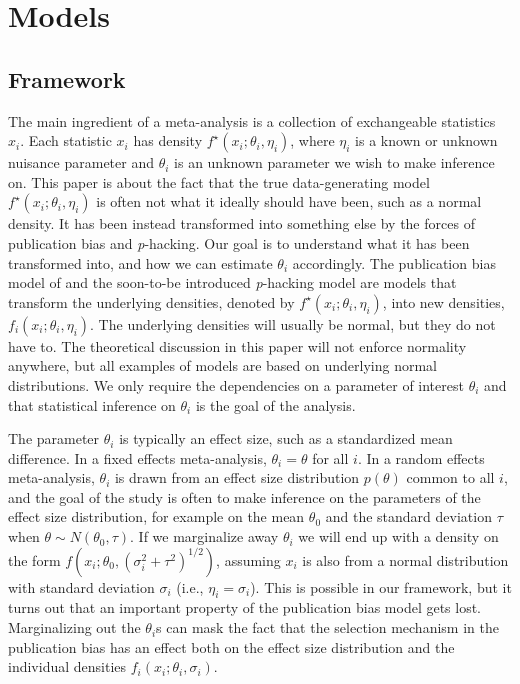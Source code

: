 \documentclass{article}
\theoremstyle{plain}
\theoremstyle{definition}
\renewcommand{\sqrt}[1]{(#1)^{1/2}}
\begin{document}
\section{Models}\label{sect:models}

\subsection{Framework}
The main ingredient of a meta-analysis is a collection of exchangeable statistics $x_{i}$. Each statistic $x_{i}$ has density $f^{\star}\left(x_{i};\theta_{i},\eta_{i}\right)$, where $\eta_i$ is a known or unknown nuisance parameter and $\theta_{i}$ is an unknown parameter we wish to make inference on. This paper is about the fact that the true data-generating model $f^{\star}\left(x_{i};\theta_{i},\eta_{i}\right)$ is often not what it ideally should have been, such as a normal density. It has been instead transformed into something else by the forces of publication bias and \textit{p}-hacking. Our goal is to understand what it has been transformed into, and how we can estimate $\theta_{i}$ accordingly. The publication bias model of \citet{hedges1992modeling,iyengar1988selection} and the soon-to-be introduced \textit{p}-hacking model are models that transform the underlying densities, denoted by $f^{\star}\left(x_{i};\theta_{i},\eta_{i}\right)$, into new densities, $f_{i}\left(x_{i};\theta_{i},\eta_{i}\right)$. The underlying densities will usually be normal, but they do not have to. The theoretical discussion in this paper will not enforce normality anywhere, but all examples of models are based on underlying normal distributions. We only require the dependencies on a parameter of interest $\theta_{i}$ and that statistical inference on $\theta_{i}$ is the goal of the analysis.

The parameter $\theta_{i}$ is typically an effect size, such as a standardized mean difference. In a fixed effects meta-analysis, $\theta_{i}=\theta$ for all $i$. In a random effects meta-analysis, $\theta_{i}$ is drawn from an effect size distribution $p\left(\theta\right)$ common to all $i$, and the goal of the study is often to make inference on the parameters of the effect size distribution, for example on the mean $\theta_{0}$ and the standard deviation $\tau$ when $\theta \sim N\left(\theta_{0},\tau\right)$. If we marginalize away $\theta_{i}$ we will end up with a density on the form $f(x_{i}; \theta_{0},\sqrt{\sigma_{i}^{2}+\tau^{2}})$, assuming $x_{i}$ is also from a normal distribution with standard deviation $\sigma_{i}$ (i.e., $\eta_i = \sigma_i$). This is possible in our framework, but it turns out that an important property of the publication bias model gets lost. Marginalizing out the $\theta_{i}$s can mask the fact that the selection mechanism in the publication bias has an effect both on the effect size distribution and the individual densities $f_{i}\left(x_{i};\theta_i, \sigma_i\right)$.
\end{document}
